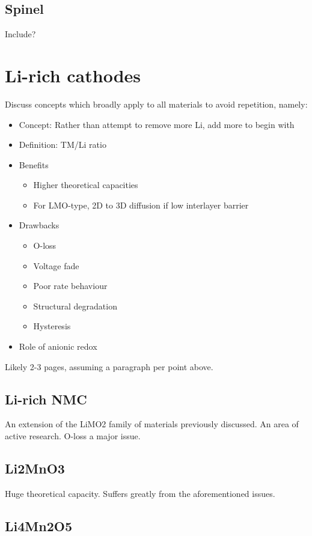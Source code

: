 \subsection{Spinel}
Include?

\section{Li-rich cathodes}
Discuss concepts which broadly apply to all materials to avoid repetition, namely:
\begin{itemize}
	\item Concept: Rather than attempt to remove more Li, add more to begin with
	\item Definition: TM/Li ratio
	\item Benefits
	\begin{itemize}
		\item Higher theoretical capacities
		\item For LMO-type, 2D to 3D diffusion if low interlayer barrier\cite{Shin2016}
	\end{itemize}
	\item Drawbacks
	\begin{itemize}
	\item O-loss
	\item Voltage fade
	\item Poor rate behaviour
	\item Structural degradation
	\item Hysteresis
	\end{itemize}
	\item Role of anionic redox\cite{Yahia2019}
	\end{itemize}
Likely 2-3 pages, assuming a paragraph per point above.
\subsection{Li-rich NMC}
An extension of the LiMO2 family of materials previously discussed.
An area of active research.
O-loss a major issue.

\subsection{Li2MnO3}
Huge theoretical capacity.
Suffers greatly from the aforementioned issues.


\subsection{Li4Mn2O5}
\citet{Bhandari2019,Diaz-Lopez2017,Diaz-Lopez2018}
